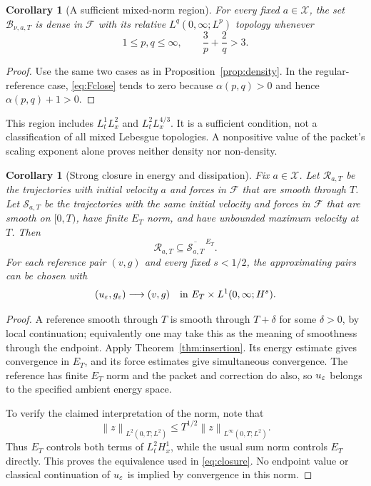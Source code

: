 \documentclass[11pt,a4paper]{article}
\newtheorem{corollary}[theorem]{Corollary}
\theoremstyle{definition}\newtheorem{definition}[theorem]{Definition}
\theoremstyle{remark}\newtheorem{remark}[theorem]{Remark}
\newcommand{\FF}{\mathcal F}\newcommand{\XX}{\mathcal X}
\newcommand{\BB}{\mathcal B}\newcommand{\PP}{\mathbb P}
\newcommand{\norm}[1]{\left\lVert#1\right\rVert}
\begin{document}
\begin{corollary}[A sufficient mixed-norm region]\label{cor:mixed}
For every fixed $a\in\XX$, the set $\BB_{\nu,a,T}$ is dense in $\FF$ with its relative $L^q(0,\infty;L^p)$ topology whenever
\begin{equation}\label{eq:mixedregion}
 1\le p,q\le\infty,\qquad \frac3p+\frac2q>3.
\end{equation}
\end{corollary}
\begin{proof}
Use the same two cases as in Proposition~\ref{prop:density}. In the regular-reference case, \eqref{eq:Fclose} tends to zero because
$\alpha(p,q)>0$ and hence $\alpha(p,q)+1>0$.
\end{proof}
This region includes $L^1_tL^2_x$ and $L^2_tL^{4/3}_x$. It is a sufficient condition, not a classification of all mixed Lebesgue topologies. A nonpositive value of the packet's scaling exponent alone proves neither density nor non-density.

\begin{corollary}[Strong closure in energy and dissipation]\label{cor:closure}
Fix $a\in\XX$. Let $\mathcal R_{a,T}$ be the trajectories with initial velocity $a$ and forces in $\FF$ that are smooth through $T$.
Let $\mathcal S_{a,T}$ be the trajectories with the same initial velocity and forces in $\FF$ that are smooth on $[0,T)$, have finite $E_T$ norm, and have unbounded maximum velocity at $T$. Then
\begin{equation}\label{eq:closure}
 \mathcal R_{a,T}\subseteq\overline{\mathcal S_{a,T}}^{\,E_T}.
\end{equation}
For each reference pair $(v,g)$ and every fixed $s<1/2$, the approximating pairs can be chosen with
\[
 (u_\varepsilon,g_\varepsilon)\longrightarrow(v,g)
 \quad\hbox{in }E_T\times L^1(0,\infty;H^s).
\]
\end{corollary}
\begin{proof}
A reference smooth through $T$ is smooth through $T+\delta$ for some
$\delta>0$, by local continuation; equivalently one may take this as the meaning of smoothness through the endpoint. Apply Theorem~\ref{thm:insertion}. Its energy estimate gives convergence in $E_T$, and its force estimates give simultaneous convergence. The reference has finite $E_T$ norm and the packet and correction do also, so $u_\varepsilon$ belongs to the specified ambient energy space.

To verify the claimed interpretation of the norm, note that
\[
 \norm{z}_{L^2(0,T;L^2)}
 \le T^{1/2}\norm{z}_{L^\infty(0,T;L^2)}.
\]
Thus $E_T$ controls both terms of $L^2_tH^1_x$, while the usual sum norm controls $E_T$ directly. This proves the equivalence used in \eqref{eq:closure}. No endpoint value or classical continuation of $u_\varepsilon$ is implied by convergence in this norm.
\end{proof}
\end{document}
